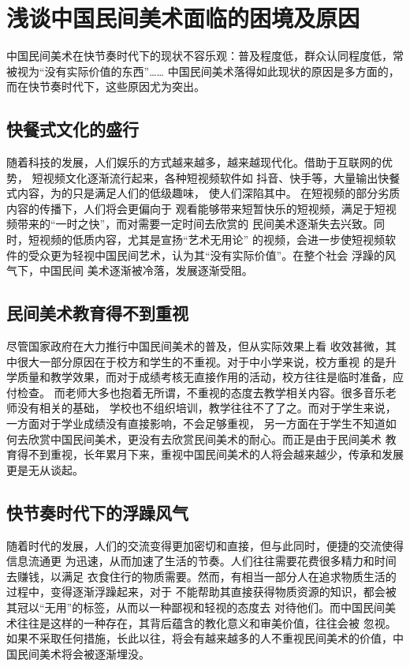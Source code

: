 \section{浅谈中国民间美术面临的困境及原因}
中国民间美术在快节奏时代下的现状不容乐观：普及程度低，群众认同程度低，常被视为“没有实际价值的东西”……
中国民间美术落得如此现状的原因是多方面的，而在快节奏时代下，这些原因尤为突出。
\subsection{快餐式文化的盛行}
随着科技的发展，人们娱乐的方式越来越多，越来越现代化。借助于互联网的优势，
短视频文化逐渐流行起来，各种短视频软件如
抖音、快手等，大量输出快餐式内容，为的只是满足人们的低级趣味，
使人们深陷其中。
在短视频的部分劣质内容的传播下，人们将会更偏向于
观看能够带来短暂快乐的短视频，满足于短视频带来的“一时之快”，而对需要一定时间去欣赏的
民间美术逐渐失去兴致。同时，短视频的低质内容，尤其是宣扬“艺术无用论”
的视频，会进一步使短视频软件的受众更为轻视中国民间艺术，认为其“没有实际价值”。在整个社会
浮躁的风气下，中国民间
美术逐渐被冷落，发展逐渐受阻。

\subsection{民间美术教育得不到重视}
尽管国家政府在大力推行中国民间美术的普及，但从实际效果上看
收效甚微，其中很大一部分原因在于校方和学生的不重视。对于中小学来说，校方重视
的是升学质量和教学效果，而对于成绩考核无直接作用的活动，校方往往是临时准备，应付检查。
而老师大多也抱着无所谓，不重视的态度去教学相关内容。很多音乐老师没有相关的基础，
学校也不组织培训，教学往往不了了之。而对于学生来说，一方面对于学业成绩没有直接影响，不会足够重视，
另一方面在于学生不知道如何去欣赏中国民间美术，更没有去欣赏民间美术的耐心。而正是由于民间美术
教育得不到重视，长年累月下来，重视中国民间美术的人将会越来越少，传承和发展更是无从谈起。


\subsection{快节奏时代下的浮躁风气}
随着时代的发展，人们的交流变得更加密切和直接，但与此同时，便捷的交流使得信息流通更
为迅速，从而加速了生活的节奏。人们往往需要花费很多精力和时间去赚钱，以满足
衣食住行的物质需要。然而，有相当一部分人在追求物质生活的过程中，变得逐渐浮躁起来，对于
不能帮助其直接获得物质资源的知识，都会被其冠以“无用”的标签，从而以一种鄙视和轻视的态度去
对待他们。而中国民间美术往往是这样的一种存在，其背后蕴含的教化意义和审美价值，往往会被
忽视。如果不采取任何措施，长此以往，将会有越来越多的人不重视民间美术的价值，中国民间美术将会被逐渐埋没。
